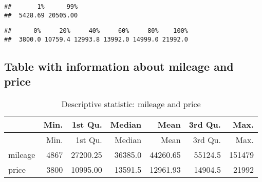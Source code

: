 \documentclass[
]{article}
\newenvironment{Shaded}{\begin{snugshade}}{\end{snugshade}}
\newcommand{\AttributeTok}[1]{\textcolor[rgb]{0.80,0.80,0.80}{#1}}
\newcommand{\CommentTok}[1]{\textcolor[rgb]{0.50,0.62,0.50}{#1}}
\newcommand{\DecValTok}[1]{\textcolor[rgb]{0.86,0.86,0.80}{#1}}
\newcommand{\FloatTok}[1]{\textcolor[rgb]{0.75,0.75,0.82}{#1}}
\newcommand{\FunctionTok}[1]{\textcolor[rgb]{0.94,0.94,0.56}{#1}}
\newcommand{\NormalTok}[1]{\textcolor[rgb]{0.80,0.80,0.80}{#1}}
\newcommand{\OtherTok}[1]{\textcolor[rgb]{0.94,0.94,0.56}{#1}}
\newcommand{\SpecialCharTok}[1]{\textcolor[rgb]{0.86,0.64,0.64}{#1}}
\newcommand{\StringTok}[1]{\textcolor[rgb]{0.80,0.58,0.58}{#1}}
\begin{document}
\begin{verbatim}
##       1%      99% 
##  5428.69 20505.00
\end{verbatim}

\begin{Shaded}
\end{Shaded}

\begin{verbatim}
##      0%     20%     40%     60%     80%    100% 
##  3800.0 10759.4 12993.8 13992.0 14999.0 21992.0
\end{verbatim}

\hypertarget{table-with-information-about-mileage-and-price}{%
\subsection{Table with information about mileage and
price}\label{table-with-information-about-mileage-and-price}}

\begin{Shaded}
\end{Shaded}

\begin{longtable}[]{@{}lrrrrrr@{}}
\caption{Descriptive statistic: mileage and price}\tabularnewline
\toprule
& Min. & 1st Qu. & Median & Mean & 3rd Qu. & Max. \\
\midrule
\endfirsthead
\toprule
& Min. & 1st Qu. & Median & Mean & 3rd Qu. & Max. \\
\midrule
\endhead
mileage & 4867 & 27200.25 & 36385.0 & 44260.65 & 55124.5 & 151479 \\
price & 3800 & 10995.00 & 13591.5 & 12961.93 & 14904.5 & 21992 \\
\bottomrule
\end{longtable}
\end{document}
